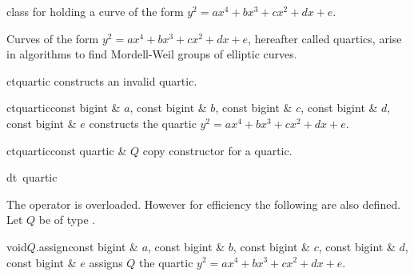 

\NAME

 \dotfill class for holding a curve of the form $y^2 = a x^4 + b x^3 + c x^2 + d x
+ e$.



\ABSTRACT

Curves of the form $y^2 = a x^4 + b x^3 + c x^2 +d x + e$, hereafter called quartics, arise in
algorithms to find Mordell-Weil groups of elliptic curves.



\DESCRIPTION



\CONS

\begin{fcode}{ct}{quartic}{}
  constructs an invalid quartic.
\end{fcode}

\begin{fcode}{ct}{quartic}{const bigint & $a$, const bigint & $b$,
    const bigint & $c$, const bigint & $d$, const bigint & $e$}%
  constructs the quartic $y^2 = a x^4 + b x^3 + c x^2 +d x + e$.
\end{fcode}

\begin{fcode}{ct}{quartic}{const quartic & $Q$}
  copy constructor for a quartic.
\end{fcode}

\begin{fcode}{dt}{~quartic}{}
\end{fcode}



\ASGN

The operator \code{=} is overloaded.  However for efficiency the following are also defined.
Let $Q$ be of type .

\begin{fcode}{void}{$Q$.assign}{const bigint & $a$, const bigint & $b$,
    const bigint & $c$, const bigint & $d$, const bigint & $e$}%
  assigns $Q$ the quartic $y^2 = a x^4 + b x^3 + c x^2 +d x + e$.
\end{fcode}

